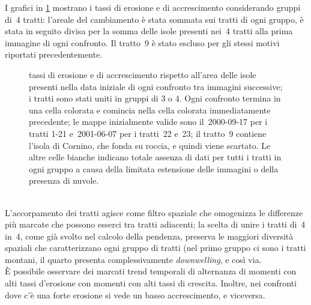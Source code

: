 I grafici in \cref{graph:eros-accr-4tr-matrix} mostrano i tassi di erosione e di accrescimento considerando gruppi di~4 tratti: l'areale del cambiamento è stata sommata sui tratti di ogni gruppo, è stata in seguito divisa per la somma delle isole presenti nei~4 tratti alla prima immagine di ogni confronto.
Il tratto~9 è stato escluso per gli stessi motivi riportati precedentemente.
%
\begin{figure}
	\centering
	
	\caption[tassi di erosione e di accrescimento unendo i tratti 4 a 4]{tassi di erosione e di accrescimento rispetto all'area delle isole presenti nella data iniziale di ogni confronto tra immagini successive; i tratti sono stati uniti in gruppi di 3 o 4.
	Ogni confronto termina in una cella colorata e comincia nella cella colorata immediatamente precedente; le mappe inizialmente valide sono il~2000-09-17 per i tratti 1-21 e~2001-06-07 per i tratti~22 e~23; il tratto~9 contiene l'isola di Cornino, che fonda su roccia, e quindi viene scartato.
	Le altre celle bianche indicano totale assenza di dati per tutti i tratti in ogni gruppo a causa della limitata estensione delle immagini o della presenza di nuvole.}
	\label{graph:eros-accr-4tr-matrix}
\end{figure}
%
\\
L'accorpamento dei tratti agisce come filtro spaziale che omogenizza le differenze più marcate che possono esserci tra tratti adiacenti; la scelta di unire i tratti di~4 in~4, come già svolto nel calcolo della pendenza, preserva le maggiori diversità spaziali che caratterizzano ogni gruppo di tratti (nel primo gruppo ci sono i tratti montani, il quarto presenta complessivamente \emph{downwelling}, e così via.
\\
È possibile osservare dei marcati trend temporali di alternanza di momenti con alti tassi d'erosione con momenti con alti tassi di crescita.
Inoltre, nei confronti dove c'è una forte erosione si vede un basso accrescimento, e viceversa.

